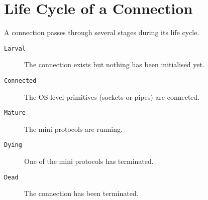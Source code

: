 \documentclass{report}
\newcommand{\hsref}[1]{}
\newcommand{\hsref}[1]
                    {\href{https://github.com/input-output-hk/ouroboros-network/blob/master/#1}
                      {\emph{Haskell source: #1}}}
\newcommand{\state}[1]{\texttt{#1}}
\newcommand{\msg}[1]{\texttt{#1}}
\theoremstyle{definition}{
  \newtheorem{lemma}{Lemma}[section] %
  \newtheorem{definition}[lemma]{Definition}
}
\theoremstyle{theorem}{
  \newtheorem{invariant}[lemma]{Invariant}
  \newtheorem{proofobligation}[lemma]{Proof Obligation}
}
\numberwithin{equation}{lemma}
\begin{document}
\newcommand{\Larval}{\state{Larval}}
\newcommand{\Connected}{\state{Connected}}
\newcommand{\Mature}{\state{Mature}}
\newcommand{\Dying}{\state{Dying}}
\newcommand{\Dead}{\state{Dead}}

\section{Life Cycle of a Connection}

A connection passes through several stages during its life cycle.
\begin{description}
\item[\Larval]    The connection exists but nothing has been initialised yet.
\item[\Connected] The OS-level primitives (sockets or pipes) are connected.
\item[\Mature] The mini protocols are running.
\item[\Dying]  One of the mini protocols has terminated.
\item[\Dead] The connection has been terminated.
\end{description}

\newcommand{\InitReq}{\msg{InitReq}}
\newcommand{\InitRsp}{\msg{InitRsp}}
\newcommand{\InitFail}{\msg{InitFail}}

\noindent\hsref{ouroboros-network/src/Ouroboros/Network/Mux/Types.hs}
\newline\hsref{ouroboros-network/src/Ouroboros/Network/NodeToNode.hs}
\newline\hsref{ouroboros-network/src/Ouroboros/Network/NodeToClient.hs}
\end{document}

